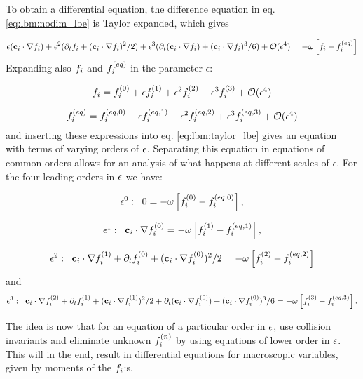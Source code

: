 To obtain a differential equation, the difference equation in
eq. \eqref{eq:lbm:nodim_lbe} is Taylor expanded, which gives

\begin{equation}\label{eq:lbm:taylor_lbe}
\epsilon(\mathbf{c}_i\cdot\nabla f_i) + \epsilon^2 (\partial_tf_i + (\mathbf{c}_i\cdot\nabla f_i)^2/2 ) + \epsilon^3
(\partial_t (\mathbf{c}_i\cdot\nabla f_i) + (\mathbf{c}_i\cdot\nabla f_i)^3/6) + \mathcal{O}(\epsilon^4) = 
-\omega \left[
  f_i - f_i^{(eq)} \right]
\end{equation}
Expanding also $f_i$ and $f_i^{(eq)}$ in the parameter $\epsilon$:

\begin{equation}\label{eq:lbm:fi_exp}
f_i = f_i^{(0)} + \epsilon f_i^{(1)} + \epsilon^2f_i^{(2)} + \epsilon^3f_i^{(3)} + \mathcal{O}(\epsilon^4)
\end{equation}

\begin{equation}\label{eq:lbm:fi_eq_exp}
f_i^{(eq)} = f_i^{(eq, 0)} + \epsilon f_i^{(eq, 1)} + \epsilon^2f_i^{(eq, 2)} + \epsilon^3f_i^{(eq, 3)} +
\mathcal{O}(\epsilon^4)
\end{equation}
and inserting these expressions into eq. \eqref{eq:lbm:taylor_lbe}
gives an equation with terms of varying orders of $\epsilon$. Separating
this equation in equations of common orders allows for an analysis of
what happens at different scales of $\epsilon$. For the four leading
orders in $\epsilon$ we have:

\begin{equation}\label{eq:lbm:ep0}
\epsilon^0:\;\; 0 = -\omega \left[
  f_i^{(0)} - f_i^{(eq, 0)} \right],
\end{equation}

\begin{equation}\label{eq:lbm:ep1}
\epsilon^1:\;\; \mathbf{c}_i\cdot\nabla f_i^{(0)} = -\omega \left[
  f_i^{(1)} - f_i^{(eq, 1)} \right],
\end{equation}

\begin{equation}\label{eq:lbm:ep2}
\epsilon^2:\;\; \mathbf{c}_i\cdot\nabla f_i^{(1)} + \partial_tf_i^{(0)} + (\mathbf{c}_i\cdot\nabla f_i^{(0)})^2/2 =
-\omega \left[ f_i^{(2)} - f_i^{(eq, 2)} \right]
\end{equation}
and
\begin{equation}\label{eq:lbm:ep3}
\epsilon^3:\;\; \mathbf{c}_i\cdot\nabla f_i^{(2)} + \partial_tf_i^{(1)} + (\mathbf{c}_i\cdot\nabla f_i^{(1)})^2/2 +
\partial_t (\mathbf{c}_i\cdot\nabla f_i^{(0)}) + (\mathbf{c}_i\cdot\nabla f_i^{(0)})^3/6 = -\omega \left[ f_i^{(3)} -
  f_i^{(eq, 3)} \right].
\end{equation}

The idea is now that for an equation of a particular order in $\epsilon$,
use collision invariants and eliminate unknown $f_i^{(n)}$ by using
equations of lower order in $\epsilon$. This will in the end, result in
differential equations for macroscopic variables, given by moments of
the $f_i$:s.

